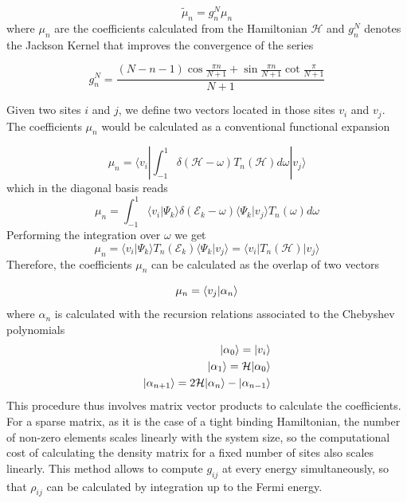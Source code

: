 \begin{equation}
\tilde \mu_n = g^N_n \mu_n
\end{equation}
where $\mu_n$ are the coefficients calculated from the Hamiltonian
$\mathcal{H}$ and $g_n^N$ denotes the Jackson Kernel that improves the
convergence of the series\cite{Weisse2006,Jackson1912}

\begin{equation}
g_n^N =
\frac{(N-n-1)\cos \frac{\pi n}{N+1} + \sin \frac{\pi n}{N+1}
\cot \frac{\pi }{N+1}
}
{N+1}
\end{equation}

Given two sites $i$ and $j$, we define two vectors located in those sites
$v_i$ and $v_j$.
The coefficients $\mu_n$ would be calculated as a conventional functional
expansion

\begin{equation}
\mu_n = \langle v_i | \int_{-1}^{1}\delta (\mathcal{H}-\omega)T_n(\mathcal{H}) d \omega | v_j \rangle
\end{equation}
which in the diagonal basis reads
\begin{equation}
\mu_n = \int_{-1}^{1}\langle v_i | \Psi_k \rangle \delta (\mathcal{E}_k-\omega) \langle \Psi_k | v_j \rangle T_n(\omega) d \omega
\end{equation}
Performing the integration over $\omega$ we get
\begin{equation}
\mu_n = \langle v_i | \Psi_k \rangle T_n(\mathcal{E}_k)  \langle \Psi_k | v_j \rangle =
\langle v_i | T_n(\mathcal{H}) | v_j \rangle
\end{equation}
Therefore, the coefficients $\mu_n$ can be calculated as the overlap of two
vectors

\begin{equation}
\mu_n =
\braket{v_j}{\alpha_n}%
\end{equation}
where $\alpha_n$ is calculated with
the recursion relations associated to the Chebyshev polynomials
\begin{equation}
\begin{aligned}
\ket{\alpha_0} = \ket{v_i}  \\  %
|\alpha_1 \rangle = \mathcal{H} | \alpha_0 \rangle \\
|\alpha_{n+1} \rangle = 2\mathcal{H} | \alpha_n \rangle-
| \alpha_{n-1} \rangle
\end{aligned}
\end{equation}
This procedure thus involves matrix vector products to calculate the
coefficients. For a sparse matrix, as it is the case of a tight binding
Hamiltonian, the number of non-zero elements scales linearly with the system
size, so the computational cost of calculating the density matrix for a fixed
number of sites also scales linearly.
This method allows to compute $g_{ij}$ at every energy simultaneously, so
that $\rho_{ij}$ can be calculated by integration up to the Fermi energy.


